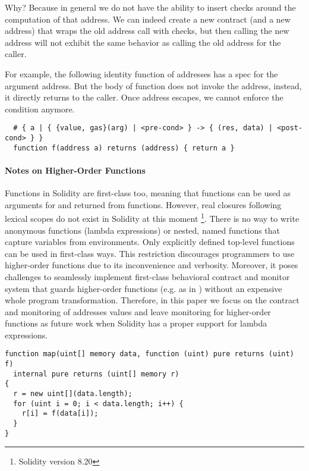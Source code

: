 Why? Because in general we do not have the ability to insert checks around the
computation of that address. We can indeed create a new contract (and a new address) that wraps the old address call with checks, but then calling
the new address will not exhibit the same behavior as calling the old address
for the caller.

For example, the following identity function of addresses has a spec
for the argument address. But the body of function does not invoke
the address, instead, it directly returns  to the caller.
Once address  escapes, we cannot enforce the condition anymore.

\begin{lstlisting}
  # { a | { {value, gas}(arg) | <pre-cond> } -> { (res, data) | <post-cond> } }
  function f(address a) returns (address) { return a }
\end{lstlisting}

\paragraph{Notes on Higher-Order Functions}
Functions in Solidity are first-class too, meaning that functions can be used
as arguments for and returned from functions.
However, real closures following lexical scopes do not exist in Solidity
at this moment \footnote{Solidity version 8.20}.
There is no way to write anonymous functions (lambda expressions) or nested,
named functions that capture variables from environments.
Only explicitly defined top-level functions can be used in first-class ways.
This restriction discourages programmers to use higher-order functions due to
its inconvenience and verbosity.
Moreover, it poses challenges to seamlessly implement first-class behavioral
contract and monitor system that guards higher-order functions (e.g. as in
\cite{DBLP:conf/icfp/FindlerF02}) without an expensive whole program
transformation.
Therefore, in this paper we focus on the contract and monitoring of addresses
values and leave monitoring for higher-order functions as future work when
Solidity has a proper support for lambda expressions.

\iffalse
	\begin{lstlisting}
function map(uint[] memory data, function (uint) pure returns (uint) f)
  internal pure returns (uint[] memory r)
{
  r = new uint[](data.length);
  for (uint i = 0; i < data.length; i++) {
    r[i] = f(data[i]);
  }
}
\end{lstlisting}

